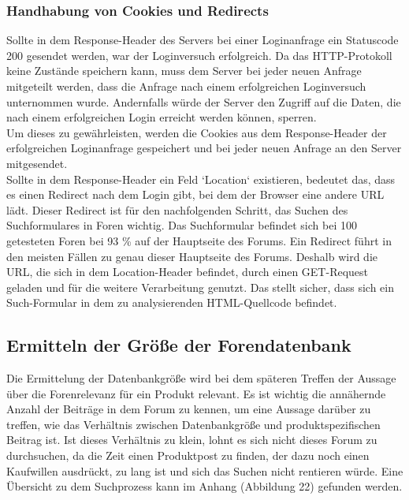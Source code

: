 \subsubsection{Handhabung von Cookies und Redirects}
Sollte in dem Response-Header des Servers bei einer Loginanfrage ein Statuscode 200 gesendet werden, war der Loginversuch erfolgreich. Da das HTTP-Protokoll keine Zustände speichern kann, muss dem Server bei jeder neuen Anfrage mitgeteilt werden, dass die Anfrage nach einem erfolgreichen Loginversuch unternommen wurde. Andernfalls würde der Server den Zugriff auf die Daten, die nach einem erfolgreichen Login erreicht werden können, sperren.\\
Um dieses zu gewährleisten, werden die Cookies aus dem Response-Header der erfolgreichen Loginanfrage gespeichert und bei jeder neuen Anfrage an den Server mitgesendet.\\
Sollte in dem Response-Header ein Feld `Location` existieren, bedeutet das, dass es einen Redirect nach dem Login gibt, bei dem der Browser eine andere URL lädt. Dieser Redirect ist für den nachfolgenden Schritt, das Suchen des Suchformulares in Foren wichtig. Das Suchformular befindet sich bei 100 getesteten Foren bei 93 \% auf der Hauptseite des Forums. Ein Redirect führt in den meisten Fällen zu genau dieser Hauptseite des Forums. Deshalb wird die URL, die sich in dem Location-Header befindet, durch einen GET-Request geladen und für die weitere Verarbeitung genutzt. Das stellt sicher, dass sich ein Such-Formular in dem zu analysierenden HTML-Quellcode befindet.


\subsection{Ermitteln der Größe der Forendatenbank}
Die Ermittelung der Datenbankgröße wird bei dem späteren Treffen der Aussage über die Forenrelevanz für ein Produkt relevant.
Es ist wichtig die annähernde Anzahl der Beiträge in dem Forum zu kennen, um eine Aussage darüber zu treffen, wie das Verhältnis zwischen Datenbankgröße und produktspezifischen Beitrag ist. Ist dieses Verhältnis zu klein, lohnt es sich nicht dieses Forum zu durchsuchen, da die Zeit einen Produktpost zu finden, der dazu noch einen Kaufwillen ausdrückt, zu lang ist und sich das Suchen nicht rentieren würde.
Eine Übersicht zu dem Suchprozess kann im Anhang (Abbildung 22) gefunden werden.
